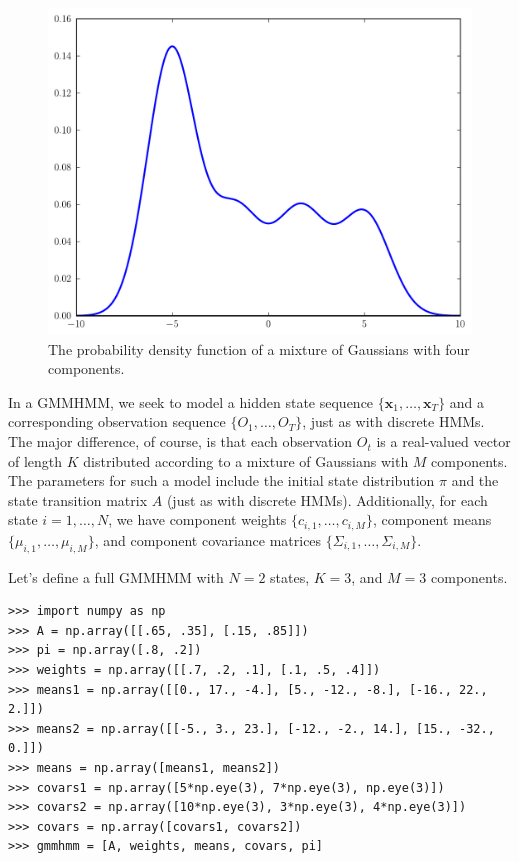 \begin{figure}
\centering
\includegraphics[width=\textwidth]{mixture}
\caption{The probability density function of a mixture of Gaussians with four components.}
\label{fig:mixture}
\end{figure}


In a GMMHMM, we seek to model a hidden state sequence $\{\mathbf{x}_1,\ldots,\mathbf{x}_T\}$ and a corresponding observation sequence $\{O_1,\ldots,O_T\}$, just as with discrete HMMs.
The major difference, of course, is that each observation $O_t$ is a real-valued vector of length $K$ distributed according to a mixture of Gaussians with $M$ components.
The parameters for such a model include the initial state distribution $\pi$ and the state transition matrix $A$ (just as with discrete HMMs).
Additionally, for each state $i=1,\ldots,N$, we have component weights $\{c_{i,1},\ldots,c_{i,M}\}$, component means $\{\mu_{i,1},\ldots,\mu_{i,M}\}$, and component covariance matrices
$\{\Sigma_{i,1},\ldots,\Sigma_{i,M}\}$.

Let's define a full GMMHMM with $N=2$ states, $K = 3$, and $M=3$ components.
\begin{lstlisting}
>>> import numpy as np
>>> A = np.array([[.65, .35], [.15, .85]])
>>> pi = np.array([.8, .2])
>>> weights = np.array([[.7, .2, .1], [.1, .5, .4]])
>>> means1 = np.array([[0., 17., -4.], [5., -12., -8.], [-16., 22., 2.]])
>>> means2 = np.array([[-5., 3., 23.], [-12., -2., 14.], [15., -32., 0.]])
>>> means = np.array([means1, means2])
>>> covars1 = np.array([5*np.eye(3), 7*np.eye(3), np.eye(3)])
>>> covars2 = np.array([10*np.eye(3), 3*np.eye(3), 4*np.eye(3)])
>>> covars = np.array([covars1, covars2])
>>> gmmhmm = [A, weights, means, covars, pi]
\end{lstlisting}

